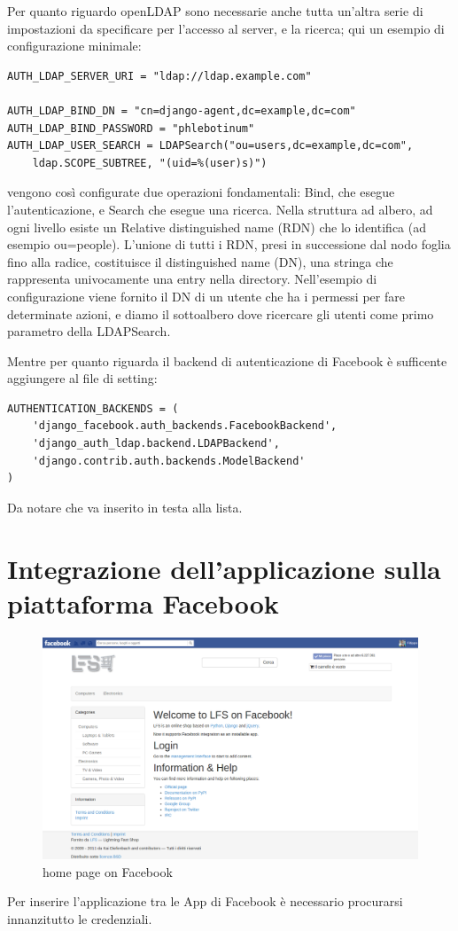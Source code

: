 Per quanto riguardo openLDAP sono necessarie anche tutta un'altra serie di impostazioni da specificare per l'accesso al server, e la ricerca; qui un esempio di configurazione minimale:
\begin{lstlisting}
AUTH_LDAP_SERVER_URI = "ldap://ldap.example.com"

AUTH_LDAP_BIND_DN = "cn=django-agent,dc=example,dc=com"
AUTH_LDAP_BIND_PASSWORD = "phlebotinum"
AUTH_LDAP_USER_SEARCH = LDAPSearch("ou=users,dc=example,dc=com",
    ldap.SCOPE_SUBTREE, "(uid=%(user)s)")
\end{lstlisting}
vengono così configurate  due operazioni fondamentali: Bind, che esegue l'autenticazione, e Search che esegue una ricerca. Nella struttura ad albero, ad ogni livello esiste un Relative distinguished name (RDN) che lo identifica (ad esempio ou=people). L'unione di tutti i RDN, presi in successione dal nodo foglia fino alla radice, costituisce il distinguished name (DN), una stringa che rappresenta univocamente una entry nella directory. Nell'esempio di configurazione viene fornito il DN di un utente che ha i permessi per fare determinate azioni, e diamo il sottoalbero dove ricercare gli utenti come primo parametro della LDAPSearch.
 
\vspace{2.5 mm}
Mentre per quanto riguarda il backend di autenticazione di Facebook è sufficente aggiungere al file di setting:

\begin{lstlisting}
AUTHENTICATION_BACKENDS = (
	'django_facebook.auth_backends.FacebookBackend',
	'django_auth_ldap.backend.LDAPBackend',
	'django.contrib.auth.backends.ModelBackend'
)
\end{lstlisting}
Da notare che va inserito in testa alla lista.
\newpage
\section{Integrazione dell'applicazione sulla piattaforma Facebook}
\begin{figure}
\centering
\includegraphics[width=0.9\columnwidth]{img/main_page}
\caption{home page on Facebook}
\end{figure}
Per inserire l'applicazione tra le App di Facebook è necessario procurarsi innanzitutto le credenziali.

